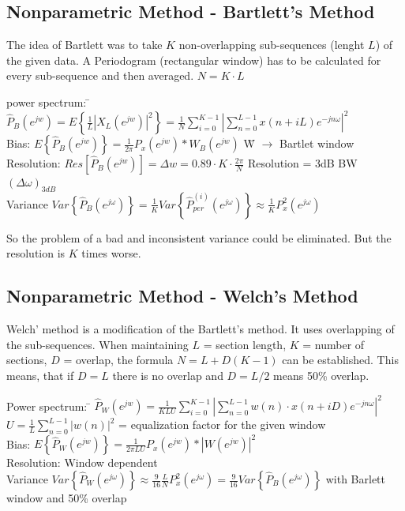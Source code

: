  
 
\subsection{Nonparametric Method - Bartlett's Method }
The idea of Bartlett was to take $K$ non-overlapping sub-sequences (lenght $L$) of the given data. 
A Periodogram (rectangular window) has to be calculated for every sub-sequence and then averaged. $N=K\cdot L$

\begin{tabbing}
power spectrum:  	\=  $\hat{P}_{B}(e^{jw}) = E\left\{\frac{1}{L}  \left|X_L(e^{jw})\right| ^2\right\} =  \frac{1}{N}\sum\limits_{i=0}^{K-1} \left|\sum\limits_{n=0}^{L-1} x(n+iL)e^{-jn\omega}\right| ^2$   \\
Bias: 				\>  $E\left\{ \hat{P}_{B}(e^{jw}) \right\} = \frac{1}{2 \pi}P_x(e^{jw})*W_B(e^{jw})$  \hspace{4cm} \= W $\to$ Bartlet window\\
Resolution: 		\>  $Res\left[\hat{P}_{B}(e^{jw})\right] = \Delta w = 0.89 \cdot K \cdot \frac{2 \pi}{N}$\> Resolution = 3dB BW $(\Delta\omega)_{3dB}$\\
Variance 			\> $Var\left\lbrace\hat{P}_{B}(e^{j\omega})\right\rbrace = \frac{1}{K} Var\left\lbrace \hat{P}_{per}^{(i)}(e^{j\omega}) \right\rbrace \approx \frac{1}{K}P^2_x(e^{j\omega})$\\
\end{tabbing}
So the problem of a bad and inconsistent variance could be eliminated. But the resolution is $K$ times worse.

\subsection{Nonparametric Method - Welch's Method }
Welch' method is a modification of the Bartlett's method. It uses overlapping of the sub-sequences.
When maintaining $L$ = section length, $K$ = number of sections, $D$ = overlap, the formula 
$\boxed{N=L+D(K-1)}$ can be established. This means, that if $D=L$ there is no overlap and $D=L/2$ means 50\% overlap.

\begin{tabbing}
Power spectrum:  	\=  $\hat{P}_{W}(e^{jw}) =  \frac{1}{KLU}\sum\limits_{i=0}^{K-1} \left|\sum\limits_{n=0}^{L-1} w(n) \cdot x(n+iD)e^{-jn\omega}\right| ^2$   \\
\>						$U = \frac 1L \sum\limits_{n=0}^{L-1}|w(n)|^2$ = equalization factor for the given window\\
Bias: 				\>  $E\left\lbrace \hat{P}_{W}(e^{jw}) \right\rbrace = \frac{1}{2 \pi LU}P_x(e^{jw})*|W(e^{jw})|^2$\\
Resolution: 		\>  Window dependent\\
Variance 			\> $Var\left\lbrace\hat{P}_{W}(e^{j\omega})\right\rbrace \approx \frac{9}{16} \frac{L}{N}P^2_x(e^{j\omega}) = 
\frac{9}{16} Var\left\lbrace\hat{P}_{B}(e^{j\omega})\right\rbrace$ \qquad with Barlett window and 50\% overlap\\
\end{tabbing}


